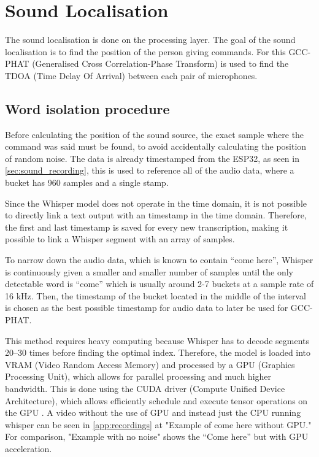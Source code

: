 \section{Sound Localisation}
\label{SEC:sound_localisation}
The sound localisation is done on the processing layer. The goal of the sound localisation is to find the position of the person giving commands. For this GCC-PHAT (Generalised Cross Correlation-Phase Transform) is used to find the TDOA (Time Delay Of Arrival) between each pair of microphones.

\subsection{Word isolation procedure}\label{sec:Locating_time_of_command}

Before calculating the position of the sound source, the exact sample where the command was said must be found, to avoid accidentally calculating the position of random noise. The data is already timestamped from the ESP32, as seen in \cref{sec:sound_recording}, this is used to reference all of the audio data, where a bucket has 960 samples and a single stamp.

Since the Whisper model does not operate in the time domain, it is not possible to directly link a text output with an timestamp in the time domain. Therefore, the first and last timestamp is saved for every new transcription, making it possible to link a Whisper segment with an array of samples.

To narrow down the audio data, which is known to contain ``come here'', Whisper is continuously given a smaller and smaller number of samples until the only detectable word is ``come'' which is usually around 2-7 buckets at a sample rate of 16 kHz. Then, the timestamp of the bucket located in the middle of the interval is chosen as the best possible timestamp for audio data to later be used for GCC-PHAT.

This method requires heavy computing because Whisper has to decode segments 20--30 times before finding the optimal index. Therefore, the model is loaded into VRAM (Video Random Access Memory) and processed by a GPU (Graphics Processing Unit), which allows for parallel processing and much higher bandwidth. This is done using the CUDA driver (Compute Unified Device Architecture), which allows efficiently schedule and execute tensor operations on the GPU \cite{cuda}.
A video without the use of GPU and instead just the CPU running whisper can be seen in \cref{app:recordings} at "Example of come here without GPU." For comparison, "Example with no noise" shows the ``Come here'' but with GPU acceleration.

